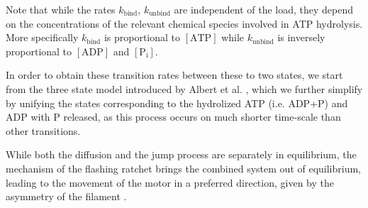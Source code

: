 \documentclass[aps,pre,twocolumn,showpacs,showkeys,superscriptaddress,floatfix]{revtex4-1}
\begin{document}
Note that while the rates $k_\text{bind}$, $k_\text{unbind}$ are independent of the load, 
they depend on the concentrations of the relevant chemical species involved in ATP hydrolysis. 
More specifically $k_\text{bind}$ is proportional to $[\text{ATP}]$ while $k_\text{unbind}$ is inversely proportional to $[\text{ADP}]$ and $[\text{P}_\text{i}]$.

In order to obtain these transition rates between these to two states, we start from the three state model introduced by Albert et al. \cite{Albert2014},
which we further simplify by unifying the states corresponding to the hydrolized ATP (i.e. ADP+P) and ADP with P released, as this process occurs on much shorter time-scale than other transitions.

While both the diffusion and the jump process are separately in equilibrium, the mechanism of the flashing ratchet brings the combined system out of equilibrium, leading to the movement of the motor in a preferred direction, given by the asymmetry of the filament \cite{Reimann2002introduction,de2007symmetries}.
\end{document}
